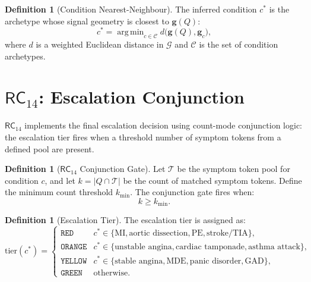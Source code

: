 \documentclass[11pt,twoside]{article}
\theoremstyle{plain}
\theoremstyle{definition}
\newtheorem{definition}[theorem]{Definition}
\theoremstyle{remark}
\DeclareMathOperator*{\argmin}{arg\,min}
\newcommand{\RC}[1]{\textsf{RC}_{#1}}
\begin{document}
\begin{definition}[Condition Nearest-Neighbour]
The inferred condition $c^*$ is the archetype whose signal geometry is closest
to $\mathbf{g}(Q)$:
\begin{equation}
  c^* = \argmin_{c\in\mathcal{C}} d\bigl(\mathbf{g}(Q),\mathbf{g}_c\bigr),
\end{equation}
where $d$ is a weighted Euclidean distance in $\mathcal{G}$ and $\mathcal{C}$
is the set of condition archetypes.
\end{definition}

\section{\texorpdfstring{$\RC{14}$}{RC14}: Escalation Conjunction}

$\RC{14}$ implements the final escalation decision using count-mode conjunction
logic: the escalation tier fires when a threshold number of symptom tokens from
a defined pool are present.

\begin{definition}[$\RC{14}$ Conjunction Gate]
Let $\mathcal{T}$ be the symptom token pool for condition $c$, and let
$k=|Q\cap\mathcal{T}|$ be the count of matched symptom tokens.  Define the
minimum count threshold $k_{\min}$.  The conjunction gate fires when:
\begin{equation}
  k \ge k_{\min}.
\end{equation}
\end{definition}

\begin{definition}[Escalation Tier]\label{def:tier}
The escalation tier is assigned as:
\begin{equation}
  \text{tier}(c^*) =
  \begin{cases}
    \mathtt{RED}    & c^*\in\{\text{MI}, \text{aortic dissection},
                       \text{PE}, \text{stroke/TIA}\},\\
    \mathtt{ORANGE} & c^*\in\{\text{unstable angina},
                       \text{cardiac tamponade}, \text{asthma attack}\},\\
    \mathtt{YELLOW} & c^*\in\{\text{stable angina}, \text{MDE},
                       \text{panic disorder}, \text{GAD}\},\\
    \mathtt{GREEN}  & \text{otherwise}.
  \end{cases}
\end{equation}
\end{definition}
\end{document}
